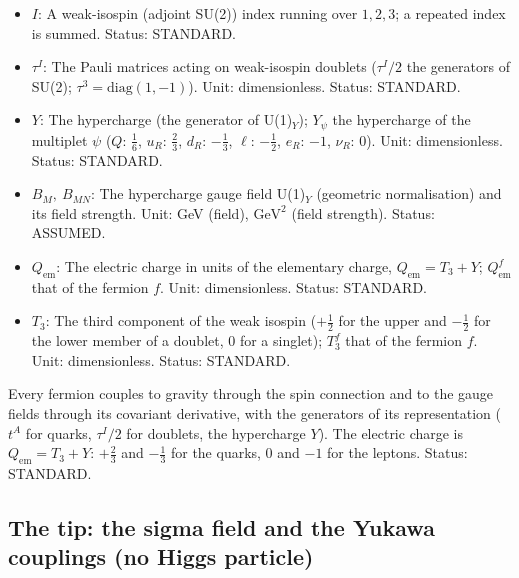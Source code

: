 \documentclass[
  10pt,
]{article}
\begin{document}
\begin{itemize}
  indices the components along the observable directions. Unit: GeV
  (field), \(\mathrm{GeV}^{2}\) (field strength). Status: ASSUMED.
\item
  \(I\): A weak-isospin (adjoint SU(2)) index running over \(1, 2, 3\);
  a repeated index is summed. Status: STANDARD.
\item
  \(\tau^I\): The Pauli matrices acting on weak-isospin doublets
  (\(\tau^I/2\) the generators of SU(2);
  \(\tau^3 = \mathrm{diag}(1, -1)\)). Unit: dimensionless. Status:
  STANDARD.
\item
  \(Y\): The hypercharge (the generator of U(1)\(_Y\)); \(Y_\psi\) the
  hypercharge of the multiplet \(\psi\) (\(Q\): \(\frac16\), \(u_R\):
  \(\frac23\), \(d_R\): \(-\frac13\), \(\ell\): \(-\frac12\), \(e_R\):
  \(-1\), \(\nu_R\): 0). Unit: dimensionless. Status: STANDARD.
\item
  \(B_M,\ B_{MN}\): The hypercharge gauge field U(1)\(_Y\) (geometric
  normalisation) and its field strength. Unit: GeV (field),
  \(\mathrm{GeV}^{2}\) (field strength). Status: ASSUMED.
\item
  \(Q_{\mathrm{em}}\): The electric charge in units of the elementary
  charge, \(Q_{\mathrm{em}} = T_3 + Y\); \(Q^f_{\mathrm{em}}\) that of
  the fermion \(f\). Unit: dimensionless. Status: STANDARD.
\item
  \(T_3\): The third component of the weak isospin (\(+\frac12\) for the
  upper and \(-\frac12\) for the lower member of a doublet, 0 for a
  singlet); \(T_3^f\) that of the fermion \(f\). Unit: dimensionless.
  Status: STANDARD.
\end{itemize}

Every fermion couples to gravity through the spin connection and to the
gauge fields through its covariant derivative, with the generators of
its representation (\(t^A\) for quarks, \(\tau^I/2\) for doublets, the
hypercharge \(Y\)). The electric charge is
\(Q_{\mathrm{em}} = T_3 + Y\): \(+\frac23\) and \(-\frac13\) for the
quarks, 0 and \(-1\) for the leptons. Status: STANDARD.

\hypertarget{the-tip-the-sigma-field-and-the-yukawa-couplings-no-higgs-particle}{%
\subsection{The tip: the sigma field and the Yukawa couplings (no Higgs
particle)}\label{the-tip-the-sigma-field-and-the-yukawa-couplings-no-higgs-particle}}
\end{document}
